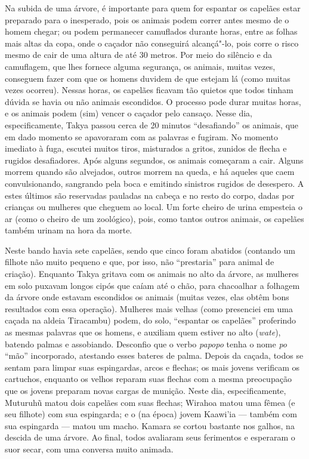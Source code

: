 Na subida de uma árvore, é importante para quem for espantar os capelães
estar preparado para o inesperado, pois os animais podem correr antes
mesmo de o homem chegar; ou podem permanecer camuflados durante horas,
entre as folhas mais altas da copa, onde o caçador não conseguirá
alcançá"-lo, pois corre o risco mesmo de cair de uma altura de até 30
metros. Por meio do silêncio e da camuflagem, que lhes fornece alguma
segurança, os animais, muitas vezes, conseguem fazer com que os homens
duvidem de que estejam lá (como muitas vezes ocorreu). Nessas horas, os
capelães ficavam tão quietos que todos tinham dúvida se havia ou não
animais escondidos. O processo pode durar muitas horas, e os animais
podem (sim) vencer o caçador pelo cansaço. Nesse dia, especificamente,
Takya passou cerca de 20 minutos ``desafiando'' os animais, que em dado
momento se apavoraram com as palavras e fugiram. No momento imediato à
fuga, escutei muitos tiros, misturados a gritos, zunidos de flecha e
rugidos desafiadores. Após alguns segundos, os animais começaram a cair.
Alguns morrem quando são alvejados, outros morrem na queda, e há aqueles
que caem convulsionando, sangrando pela boca e emitindo sinistros
rugidos de desespero. A estes últimos são reservadas pauladas na cabeça
e no resto do corpo, dadas por crianças ou mulheres que cheguem ao
local. Um forte cheiro de urina empesteia o ar (como o cheiro de um
zoológico), pois, como tantos outros animais, os capelães também urinam
na hora da morte.

Neste bando havia sete capelães, sendo que cinco foram abatidos
(contando um filhote não muito pequeno e que, por isso, não ``prestaria''
para animal de criação). Enquanto Takya gritava com os animais no alto
da árvore, as mulheres em solo puxavam longos cipós que caíam até o
chão, para chacoalhar a folhagem da árvore onde estavam escondidos os
animais (muitas vezes, elas obtêm bons resultados com essa operação).
Mulheres mais velhas (como presenciei em uma caçada na aldeia Tiracambu)
podem, do solo, ``espantar os capelães'' proferindo as mesmas palavras que
os homens, e auxiliam quem estiver no alto (\emph{wate}), batendo palmas
e assobiando. Desconfio que o verbo \emph{papopo} tenha o nome \emph{po}
``mão'' incorporado, atestando esses bateres de palma. Depois da caçada,
todos se sentam para limpar suas espingardas, arcos e flechas; os mais
jovens verificam os cartuchos, enquanto os velhos reparam suas flechas
com a mesma preocupação que os jovens preparam novas cargas de munição.
Neste dia, especificamente, Muturuhũ matou dois capelães com suas
flechas; Wirahoa matou uma fêmea (e seu filhote) com sua espingarda; e o
(na época) jovem Kaawi'ia --- também com sua espingarda --- matou um macho.
Kamara se cortou bastante nos galhos, na descida de uma árvore. Ao
final, todos avaliaram seus ferimentos e esperaram o suor secar, com uma
conversa muito animada.

